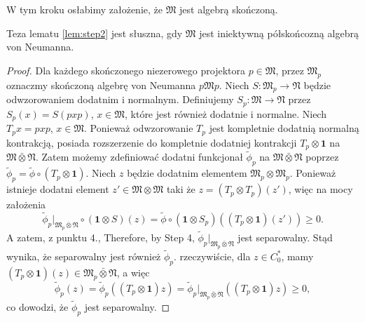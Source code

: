 W tym kroku osłabimy założenie, że $\mathfrak{M}$ jest algebrą skończoną.
\begin{Lemma}
Teza lematu \ref{lem:step2} jest słuszna, gdy
$\mathfrak{M}$ jest iniektywną półskońcozną algebrą von Neumanna.
\end{Lemma}
\begin{proof}
Dla każdego skończonego niezerowego projektora $p \in \mathfrak{M}$,
przez $\mathfrak{M}_{p}$ oznaczmy skończoną algebrę von Neumanna
$p \mathfrak{M} p$.
Niech $S : \mathfrak{M}_{p} \rightarrow \mathfrak{N}$ będzie odwzorowaniem
dodatnim i normalnym.
Definiujemy $S_{p} : \mathfrak{M} \rightarrow \mathfrak{N}$
przez $S_{p}(x) = S(pxp)$, $x \in \mathfrak{M}$,
które jest również dodatnie i normalne.
Niech $T_{p}x = p x p$, $x \in \mathfrak{M}$.
Ponieważ odwzorowanie $T_{p}$ jest kompletnie dodatnią normalną kontrakcją,
posiada rozszerzenie do kompletnie dodatniej kontrakcji
$T_{p} \otimes \mathbf{1}$ na $\mathfrak{M} \bar{\otimes} \mathfrak{N}$.
Zatem możemy zdefiniować dodatni funkcjonał $\tilde{\phi}_{p}$ na
$\mathfrak{M} \bar{\otimes} \mathfrak{N}$ poprzez
$\tilde{\phi}_{p} = \tilde{\phi} \circ (T_{p} \otimes \mathbf{1})$.
Niech $z$ będzie dodatnim elementem $\mathfrak{M}_{p} \otimes \mathfrak{M}_{p}$.
Ponieważ istnieje dodatni element $z' \in \mathfrak{M} \otimes \mathfrak{M}$
taki że $z = (T_{p} \otimes T_{p})(z')$, więc na mocy założenia
\begin{equation}
\tilde{\phi}_{p} \big|_{\mathfrak{M}_{p} \bar{\otimes} \mathfrak{N}}
\circ (\mathbf{1} \otimes S)(z) =
\tilde{\phi} \circ (\mathbf{1} \otimes S_{p})
\left( (T_{p} \otimes \mathbf{1})(z') \right ) \geq 0.
\end{equation}
A zatem, z punktu 4.,
Therefore, by Step 4,
$\tilde{\phi}_{p} \big|_{\mathfrak{M}_{p} \bar{\otimes} \mathfrak{N}}$
jest separowalny.
Stąd wynika, że separowalny jest również $\tilde{\phi}_{p}$.
rzeczywiście, dla $z\in C_{0}^{*}$, mamy
$(T_{p} \otimes \mathbf{1})(z) \in
\mathfrak{M}_{p} \bar{\otimes} \mathfrak{N}$, a więc
\begin{equation}
\tilde{\phi}_{p}(z) = \tilde{\phi}_{p}((T_{p} \otimes \mathbf{1}) z) =
\tilde{\phi}_{p} \big|_{\mathfrak{M}_{p} \bar{\otimes} \mathfrak{N}}
((T_{p} \otimes \mathbf{1}) z) \geq 0,
\end{equation}
co dowodzi, że $\tilde{\phi}_{p}$ jest separowalny.


\end{proof}

